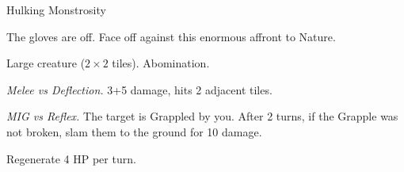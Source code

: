 \begin{monsterboxbg}{Hulking Monstrosity}

    The gloves are off. Face off against this enormous affront to Nature.
    
    \rpghline
    \stats[
        STR = \stat{20}, 
        DEX = \stat{14},
        CON = \stat{18},
        INT = \stat{10},
        WIS = \stat{10},
        CHA = \stat{12},
    ]
    \rpghline

    \basics[
    armorclass = 1,
    hitpoints  = 64,
    focus      = 5,
    defenses   = {Deflection 3, Reflex 3, Fortitude 9, Will 1}
    ]
    \rpghline

    \details[%
    skills = {Athletics 2},
    accuracies = {Melee 4, Ranged 0},
    challenge = Elite,
    ]
    \rpghline%
    \begin{rpg-monsteraction}
        Large creature ($2 \times 2$ tiles). Abomination.
    \end{rpg-monsteraction}

    

    \begin{rpg-monsteraction}
        \textit{Melee vs Deflection.} 3+5 damage, hits 2 adjacent tiles.
    \end{rpg-monsteraction}

    \begin{rpg-monsteraction}
        \textit{MIG vs Reflex.} The target is Grappled by you. After 2 turns, if the Grapple was not broken, slam them to the ground for 10 damage.
    \end{rpg-monsteraction}

    \begin{rpg-monsteraction}
    \end{rpg-monsteraction}

    \begin{rpg-monsteraction}
    \end{rpg-monsteraction}


    \begin{rpg-monsteraction}[Stalwart]
    \end{rpg-monsteraction}

    \begin{rpg-monsteraction}
        Regenerate 4 HP per turn.
    \end{rpg-monsteraction}


\end{monsterboxbg}




